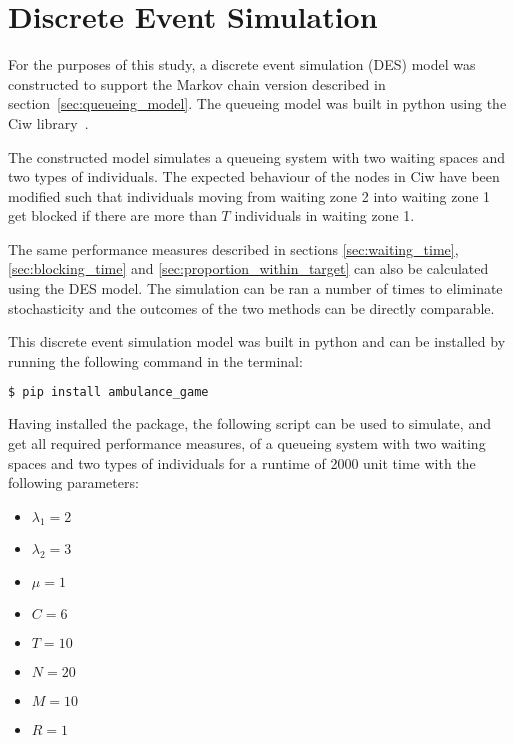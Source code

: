 \section{Discrete Event Simulation}\label{sec:appendix_des}

For the purposes of this study, a discrete event simulation (DES) model was
constructed to support the Markov chain version described in 
section~\ref{sec:queueing_model}.
The queueing model was built in python using the Ciw 
library~\cite{ciwpython}.

The constructed model simulates a queueing system with two waiting spaces and 
two types of individuals. 
The expected behaviour of the nodes in Ciw have been modified such that 
individuals moving from waiting zone 2 into waiting zone 1 get blocked 
if there are more than \(T\) individuals in waiting zone 1.

The same performance measures described in sections 
\ref{sec:waiting_time}, \ref{sec:blocking_time} and 
\ref{sec:proportion_within_target} can also be calculated using the DES model.
The simulation can be ran a number of times to eliminate stochasticity and the
outcomes of the two methods can be directly comparable. 

This discrete event simulation model was built in python and can be installed by 
running the following command in the terminal:
\begin{lstlisting}[language=bash, style=terminalstyle]
    $ pip install ambulance_game
\end{lstlisting}

Having installed the package, the following script can be used to simulate, and 
get all required performance measures, of a queueing system with two waiting 
spaces and two types of individuals for a runtime of 2000 unit time with the 
following parameters:

\begin{multicols}{2}
    \begin{itemize}
        \centering
        \item \( \lambda_1 = 2 \)
        \item \( \lambda_2 = 3 \)
        \item \( \mu = 1 \)
        \item \( C = 6 \)
        \columnbreak
        \item \( T = 10 \)
        \item \( N = 20 \)
        \item \( M = 10 \)
        \item \( R = 1 \)
    \end{itemize}
\end{multicols}

